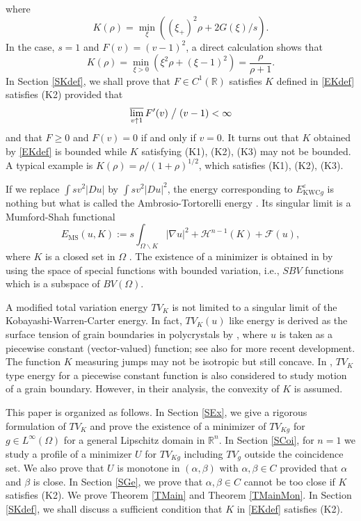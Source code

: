 \documentclass[11pt]{amsart} %
\numberwithin{equation}{section}
\begin{document}
where
\begin{equation} \label{EKdef}
	K(\rho) = \min_\xi \left( (\xi_+)^2 \rho + 2G(\xi)/s \right).
\end{equation}
In the case, $s=1$ and $F(v)=(v-1)^2$, a direct calculation shows that 
\[
	K(\rho) = \min_{\xi>0} \left( \xi^2 \rho + (\xi-1)^2 \right)
	= \frac{\rho}{\rho+1}.
\]
In Section \ref{SKdef}, we shall prove that $F\in C^1(\mathbb{R})$ satisfies $K$ defined in \eqref{EKdef} satisfies (K2) provided that
\[
	\varlimsup_{v\uparrow1} F'(v) \bigm/ (v-1) < \infty
\]
and that $F\ge0$ and $F(v)=0$ if and only if $v=0$.
 It turns out that $K$ obtained by \eqref{EKdef} is bounded while $K$ satisfying (K1), (K2), (K3) may not be bounded.
 A typical example is $K(\rho)=\rho/(1+\rho)^{1/2}$, which satisfies (K1), (K2), (K3).

If we replace $\int sv^2|Du|$ by $\int sv^2|Du|^2$, the energy corresponding to $E_{\mathrm{KWC}g}^\varepsilon$ is nothing but what is called the Ambrosio-Tortorelli energy \cite{AT}.
 Its singular limit is a Mumford-Shah functional
\[
	E_\mathrm{MS} (u,K) := s \int_{\Omega\backslash K} |\nabla u|^2 + \mathcal{H}^{n-1}(K) + \mathcal{F}(u),
\]
where $K$ is a closed set in $\Omega$ \cite{AT, AT2, FL}.
 The existence of a minimizer is obtained in \cite{GCL} by using the space of special functions with bounded variation, i.e., $SBV$ functions which is a subspace of $BV(\Omega)$.

A modified total variation energy $TV_K$ is not limited to a singular limit of the Kobayashi-Warren-Carter energy.
 In fact, $TV_K(u)$ like energy is derived as the surface tension of grain boundaries in polycrystals by \cite{LL}, where $u$ is taken as a piecewise constant (vector-valued) function; see also \cite{FGaSp} for more recent development.
 The function $K$ measuring jumps may not be isotropic but still concave.
 In \cite{ELM}, $TV_K$ type energy for a piecewise constant function is also considered to study motion of a  grain boundary.
 However, in their analysis, the convexity of $K$ is assumed.
 

This paper is organized as follows.
 In Section \ref{SEx}, we give a rigorous formulation of $TV_K$ and prove the existence of a minimizer of $TV_{Kg}$ for $g\in L^\infty(\Omega)$ for a general Lipschitz domain in $\mathbb{R}^n$.
 In Section \ref{SCoi}, for $n=1$ we study a profile of a minimizer $U$ for $TV_{Kg}$ including $TV_g$ outside the coincidence set.
 We also prove that $U$ is monotone in $(\alpha,\beta)$ with $\alpha,\beta\in C$ provided that $\alpha$ and $\beta$ is close.
 In Section \ref{SGe}, we prove that $\alpha,\beta\in C$ cannot be too close if $K$ satisfies (K2).
 We prove Theorem \ref{TMain} and Theorem \ref{TMainMon}.
 In Section \ref{SKdef}, we shall discuss a sufficient condition that $K$ in \eqref{EKdef} satisfies (K2).
\end{document}
